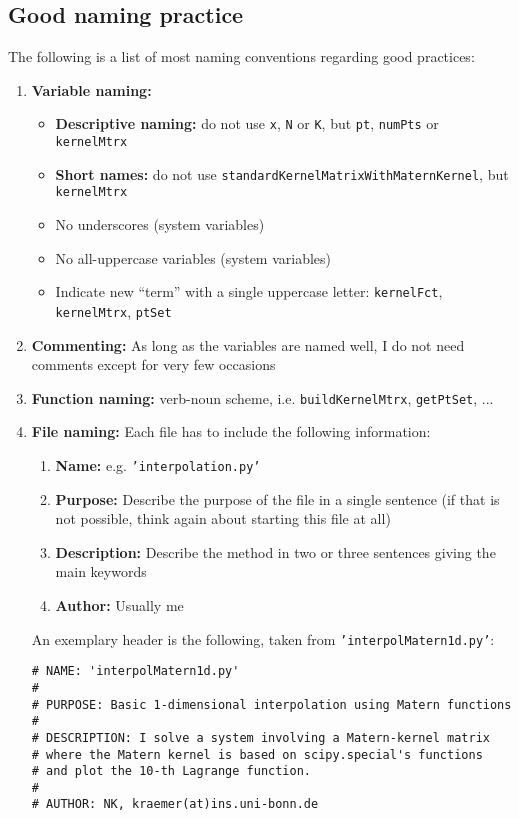 \documentclass[12pt]{article}
\begin{document}
\subsection{Good naming practice}
The following is a list of most naming conventions regarding good practices:
\begin{enumerate}
\item \textbf{Variable naming:} 
\begin{itemize}
\item \textbf{Descriptive naming:} do not use \texttt{x}, \texttt{N} or \texttt{K}, but \texttt{pt}, \texttt{numPts} or \texttt{kernelMtrx}
\item \textbf{Short names:} do not use \texttt{standardKernelMatrixWithMaternKernel}, but \texttt{kernelMtrx}
\item No underscores (system variables)
\item No all-uppercase variables (system variables)
\item Indicate new ``term'' with a single uppercase letter: \texttt{kernelFct}, \texttt{kernelMtrx}, \texttt{ptSet}
\end{itemize}
\item \textbf{Commenting:} As long as the variables are named well, I do not need comments except for very few occasions
\item \textbf{Function naming:} verb-noun scheme, i.e. \texttt{buildKernelMtrx}, \texttt{getPtSet}, ...
\item \textbf{File naming:} Each file has to include the following information:
\begin{enumerate}
\item \textbf{Name:} e.g. \texttt{'interpolation.py'}
\item \textbf{Purpose:} Describe the purpose of the file in a single sentence (if that is not possible, think again about starting this file at all)
\item \textbf{Description:} Describe the method in two or three sentences giving the main keywords
\item \textbf{Author:} Usually me
\end{enumerate}
An exemplary header is the following, taken from \texttt{'interpolMatern1d.py'}:
\begin{Verbatim}[formatcom=\color{blue!50!black}]
# NAME: 'interpolMatern1d.py'
#
# PURPOSE: Basic 1-dimensional interpolation using Matern functions
#
# DESCRIPTION: I solve a system involving a Matern-kernel matrix 
# where the Matern kernel is based on scipy.special's functions
# and plot the 10-th Lagrange function.
#
# AUTHOR: NK, kraemer(at)ins.uni-bonn.de
\end{Verbatim}
\end{enumerate}
\end{document}

